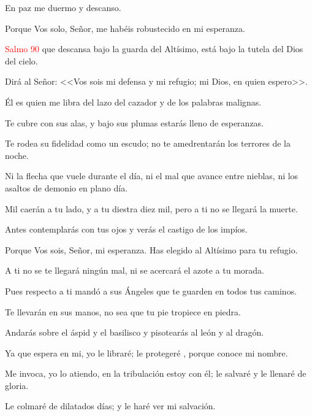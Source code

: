 \documentclass[9pt]{article}
\begin{document}
\begin{multicols}{2}
      En paz me duermo y descanso.

      Porque Vos solo, Señor, me habéis robustecido en mi esperanza.

      \vspace{1mm}

      \begin{otherlanguage}{latin}
            
      \end{otherlanguage}

      \vspace{1mm}

      \hfill\textcolor{red}{Salmo 90}
      que descansa bajo la guarda del Altísimo, está bajo la tutela del Dios del cielo.

      Dirá al Señor: <<Vos sois mi defensa y mi refugio; mi Dios, en quien espero>>.

      Él es quien me libra del lazo del cazador y de los palabras malignas.

      Te cubre con sus alas, y bajo sus plumas estarás lleno de esperanzas.

      Te rodea su fidelidad como un escudo; no te amedrentarán los terrores de la noche.

      Ni la flecha que vuele durante el día, ni el mal que avance entre nieblas, ni los asaltos de demonio en plano día.

      Mil caerán a tu lado, y a tu diestra diez mil, pero a ti no se llegará la muerte.

      Antes contemplarás con tus ojos y verás el castigo de los impíos.

      Porque Vos sois, Señor, mi esperanza. Has elegido al Altísimo para tu refugio.

      A ti no se te llegará ningún mal, ni se acercará el azote a tu morada.

      Pues respecto a ti mandó a sus Ángeles que te guarden en todos tus caminos.

      Te llevarán en sus manos, no sea que tu pie tropiece en piedra.

      Andarás sobre el áspid y el basilisco y pisotearás al león y al dragón.

      Ya que espera en mi, yo le libraré; le protegeré , porque conoce mi nombre.

      Me invoca, yo lo atiendo, en la tribulación estoy con él; le salvaré y le llenaré de gloria.

      Le colmaré de dilatados días; y le haré ver mi salvación.


\end{multicols}
\end{document}
